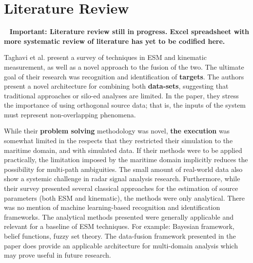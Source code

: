 \section{Literature Review}~\label{sec:literature}
\textbf{Important: Literature review still in progress. Excel spreadsheet with more systematic review of literature has yet to be codified here.}

Taghavi et al. \cite{taghavi_object_2016} present a survey of techniques in \ac{ESM} and kinematic measurement, as well as a novel approach to the fusion of the two. 
The ultimate goal of their research was recognition and identification of \textbf{targets}. 
The authors present a novel architecture for combining both \textbf{data-sets}, suggesting that traditional approaches or silo-ed analyses are limited. 
In the paper, they stress the importance of using orthogonal source data; that is, the inputs of the system must represent non-overlapping phenomena.

While their \textbf{problem solving} methodology was novel, 
\textbf{the execution} was somewhat limited in the respects that they restricted their simulation to the maritime domain, and with simulated data.
If their methods were to be applied practically, the limitation imposed by the maritime domain implicitly reduces the possibility for multi-path ambiguities.
The small amount of real-world data also show a systemic challenge in radar signal analysis research.
Furthermore, while their survey presented several classical approaches for the estimation of source parameters (both \ac{ESM} and kinematic), the methods were only analytical.
There was no mention of machine learning-based recognition and identification frameworks. The analytical methods presented were generally applicable and relevant for a baseline of ESM techniques.
For example: Bayesian framework, belief functions, fuzzy set theory.
The data-fusion framework presented in the paper does provide an applicable architecture for multi-domain analysis which may prove useful in future research.

